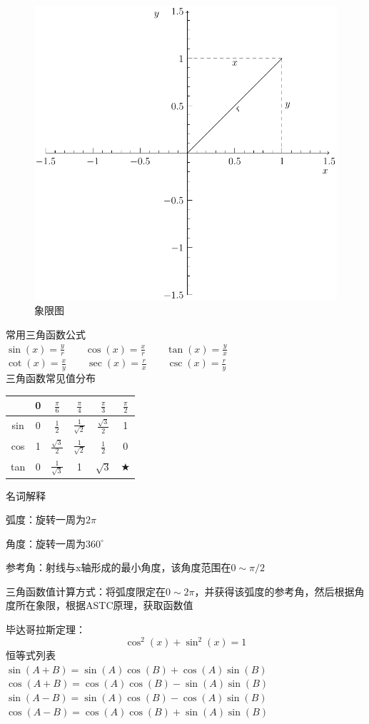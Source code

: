 \documentclass[UTF8,fontset=ubuntu]{ctexart}
\begin{document}
\parindent=0pt
\begin{figure}[H]
	\centering
	\includegraphics[scale=0.4]{quadrantal.pdf}
	\caption{象限图}
\end{figure}
常用三角函数公式\\
$\sin (x)=\frac{y}{r}\qquad\cos (x)=\frac{x}{r}\qquad\tan (x)=\frac{y}{x}$\\
$\cot (x)=\frac{x}{y}\qquad\sec (x)=\frac{r}{x}\qquad\csc (x)=\frac{r}{y}$\\
三角函数常见值分布\\
\begin{table}[H]
\centering
\begin{tabular}{c|c c c c c}
	\hline
	& 0 & $\frac{\pi}{6}$ & $\frac{\pi}{4}$ & $\frac{\pi}{3}$ & $\frac{\pi}{2}$\\
	\hline
	sin & 0 & $\frac{1}{2}$ & $\frac{1}{\sqrt{2}}$ & $\frac{\sqrt{3}}{2}$ & 1\\
	cos & 1 & $\frac{\sqrt{3}}{2}$ & $\frac{1}{\sqrt{2}}$ & $\frac{1}{2}$ & 0\\
	tan & 0 & $\frac{1}{\sqrt{3}}$ & 1 & $\sqrt{3}$ & $\bigstar$\\
	\hline
\end{tabular}
\end{table}
名词解释\par
弧度：旋转一周为$2\pi$\par
角度：旋转一周为$360^\circ$\par
参考角：射线与x轴形成的最小角度，该角度范围在$0\sim\pi/2$\par
三角函数值计算方式：将弧度限定在$0\sim2\pi$，并获得该弧度的参考角，然后根据角度所在象限，根据ASTC原理，获取函数值\par
毕达哥拉斯定理：
\[
\cos^2(x)+\sin^2(x)=1
\]
恒等式列表\\
$\sin (A+B)=\sin (A)\cos (B)+\cos (A)\sin (B)$\\
$\cos (A+B)=\cos (A)\cos (B)-\sin (A)\sin (B)$\\
$\sin (A-B)=\sin (A)\cos (B)-\cos (A)\sin (B)$\\
$\cos (A-B)=\cos (A)\cos (B)+\sin (A)\sin (B)$\\
\end{document}

